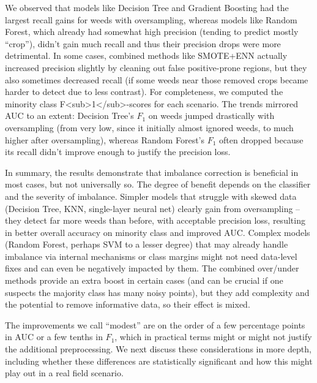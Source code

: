 \documentclass[agriengineering,article,submit,pdftex,moreauthors]{Definitions/mdpi}
\begin{document}
We observed that models like Decision Tree and Gradient Boosting had the largest recall gains for weeds with oversampling, whereas models like Random Forest, which already had somewhat high precision (tending to predict mostly “crop”), didn’t gain much recall and thus their precision drops were more detrimental. In some cases, combined methods like SMOTE+ENN actually increased precision slightly by cleaning out false positive-prone regions, but they also sometimes decreased recall (if some weeds near those removed crops became harder to detect due to less contrast). For completeness, we computed the minority class F<sub>1</sub>-scores for each scenario. The trends mirrored AUC to an extent: Decision Tree’s $F_{1}$ on weeds jumped drastically with oversampling (from very low, since it initially almost ignored weeds, to much higher after oversampling), whereas Random Forest’s $F_{1}$ often dropped because its recall didn’t improve enough to justify the precision loss. 

In summary, the results demonstrate that imbalance correction is beneficial in most cases, but not universally so. The degree of benefit depends on the classifier and the severity of imbalance. Simpler models that struggle with skewed data (Decision Tree, KNN, single-layer neural net) clearly gain from oversampling – they detect far more weeds than before, with acceptable precision loss, resulting in better overall accuracy on minority class and improved AUC. Complex models (Random Forest, perhaps SVM to a lesser degree) that may already handle imbalance via internal mechanisms or class margins might not need data-level fixes and can even be negatively impacted by them. The combined over/under methods provide an extra boost in certain cases (and can be crucial if one suspects the majority class has many noisy points), but they add complexity and the potential to remove informative data, so their effect is mixed.

The improvements we call “modest” are on the order of a few percentage points in AUC or a few tenths in $F_{1}$, which in practical terms might or might not justify the additional preprocessing. We next discuss these considerations in more depth, including whether these differences are statistically significant and how this might play out in a real field scenario.
\end{document}

